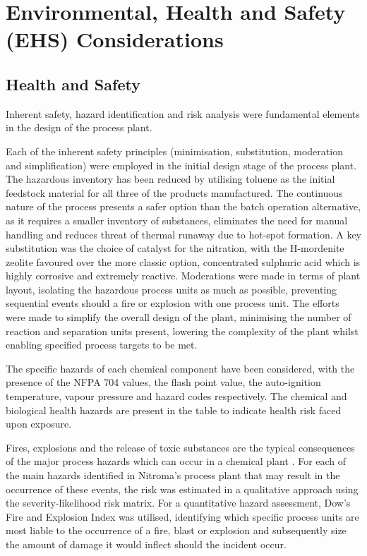 \section{Environmental, Health and Safety (EHS) Considerations}
\label{sec:ehs}
\subsection{Health and Safety}

Inherent safety, hazard identification and risk analysis were fundamental elements in the design of the process plant. 

Each of the inherent safety principles (minimisation, substitution, moderation and simplification) were employed in the initial design stage of the process plant. The hazardous inventory has been reduced by utilising toluene as the initial feedstock material for all three of the products manufactured. The continuous nature of the process presents a safer option than the batch operation alternative, as it requires a smaller inventory of substances, eliminates the need for manual handling and reduces threat of thermal runaway due to hot-spot formation. A key substitution was the choice of catalyst for the nitration, with the H-mordenite zeolite favoured over the more classic option, concentrated sulphuric acid which is highly corrosive and extremely reactive. Moderations were made in terms of plant layout, isolating the hazardous process units as much as possible, preventing sequential events should a fire or explosion with one process unit. The efforts were made to simplify the overall design of the plant, minimising the number of reaction and separation units present, lowering the complexity of the plant whilst enabling specified process targets to be met. 

The specific hazards of each chemical component have been considered, with the presence of the NFPA 704 values, the flash point value, the auto-ignition temperature, vapour pressure and hazard codes respectively. The chemical and biological health hazards are present in the table to indicate health risk faced upon exposure.  

Fires, explosions and the release of toxic substances are the typical consequences of the major process hazards which can occur in a chemical plant \cite{mannan_lees_2012}. For each of the main hazards identified in Nitroma's process plant that may result in the occurrence of these events, the risk was estimated in a qualitative approach using the severity-likelihood risk matrix. For a quantitative hazard assessment, Dow's Fire and Explosion Index was utilised, identifying which specific process units are most liable to the occurrence of a fire, blast or explosion and subsequently size the amount of damage it would inflect should the incident occur. 

